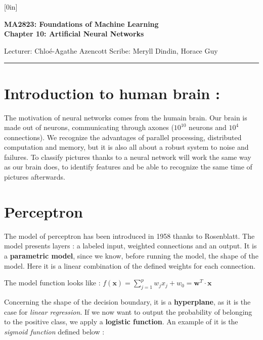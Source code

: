 \documentclass[a4paper,12pt]{article}
\newcommand{\xx}{{\bm x}}
\newcommand{\ww}{{\bm w}}
\begin{document}
\raisebox{0.6in}[0in]{}
\vspace{-0.7in}

\begin{center}
\bf\large MA2823: Foundations of Machine Learning \\
Chapter 10: Artificial Neural Networks
\end{center}

\noindent
Lecturer: Chlo\'e-Agathe Azencott   
\hfill
Scribe: Meryll Dindin, Horace Guy

\noindent
\rule{\textwidth}{1pt}

\medskip


\section{Introduction to human brain :}

\indent
The motivation of neural networks comes from the humain brain. Our brain is made out of neurons, communicating through axones ($10^{10}$ neurons and $10^4$ connections). We recognize the advantages of parallel processing, distributed computation and memory, but it is also all about a robust system to noise and failures. To classify pictures thanks to a neural network will work the same way as our brain does, to identify features and be able to recognize the same time of pictures afterwards.

\section{Perceptron}

\indent
The model of perceptron has been introduced in 1958 thanks to Rosenblatt. The model presents layers : a labeled input, weighted connections and an output. It is a {\bfseries parametric model}, since we know, before running the model, the shape of the model. Here it is a linear combination of the defined weights for each connection. 

\vspace{0.1in}

\centerline{The model function looks like : $f(\xx) = \sum_{j=1}^p w_j x_j + w_0 = \ww^T \cdot \xx$ }

\vspace{0.1in}

\indent
Concerning the shape of the decision boundary, it is a {\bfseries hyperplane}, as it is the case for {\itshape linear regression}. If we now want to output the probability of belonging to the positive class, we apply a {\bfseries logistic function}. An example of it is the {\itshape sigmoid function} defined below :
\end{document}
